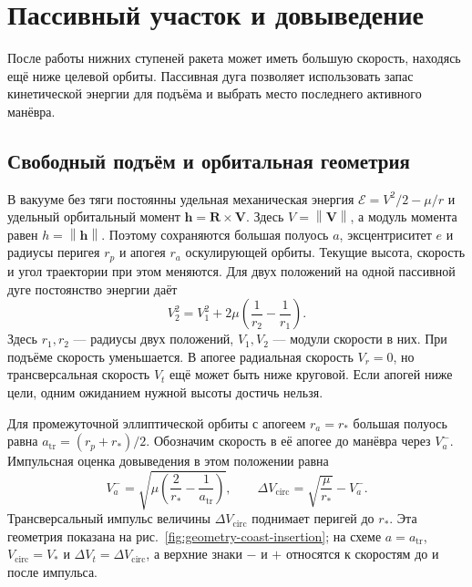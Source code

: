 \documentclass[a4paper,11pt]{article}
\newcommand{\vect}[1]{\boldsymbol{#1}}
\newcommand{\norm}[1]{\left\lVert#1\right\rVert}
\numberwithin{equation}{section}
\begin{document}
\FloatBarrier
\section{Пассивный участок и довыведение}
\label{sec:coast}

После работы нижних ступеней ракета может иметь
большую скорость, находясь ещё ниже целевой орбиты.
Пассивная дуга позволяет использовать запас кинетической
энергии для подъёма и выбрать место последнего активного манёвра.

\subsection{Свободный подъём и орбитальная геометрия}

В вакууме без тяги постоянны удельная механическая энергия
$\mathcal E=V^2/2-\mu/r$ и удельный орбитальный момент
$\vect h=\vect R\times\vect V$. Здесь $V=\norm{\vect V}$,
а модуль момента равен $h=\norm{\vect h}$.
Поэтому сохраняются большая полуось $a$, эксцентриситет $e$
и радиусы перигея $r_p$ и апогея $r_a$ оскулирующей орбиты.
Текущие высота, скорость и угол траектории при этом меняются.
Для двух положений на одной пассивной дуге постоянство энергии даёт
\begin{equation}
V_2^2=V_1^2+2\mu\left(\frac1{r_2}-\frac1{r_1}\right).
\label{eq:coast-speed}
\end{equation}
Здесь $r_1,r_2$ --- радиусы двух положений, $V_1,V_2$ ---
модули скорости в них. При подъёме скорость уменьшается.
В апогее радиальная скорость $V_r=0$, но трансверсальная
скорость $V_t$ ещё может быть ниже круговой.
Если апогей ниже цели, одним ожиданием нужной высоты
достичь нельзя.

Для промежуточной эллиптической орбиты с апогеем $r_a=r_*$
большая полуось равна $a_{\mathrm{tr}}=(r_p+r_*)/2$.
Обозначим скорость в её апогее до манёвра через $V_a^-$.
Импульсная оценка довыведения в этом положении равна
\begin{equation}
V_a^-=\sqrt{\mu\left(\frac2{r_*}
-\frac1{a_{\mathrm{tr}}}\right)},\qquad
\Delta V_{\mathrm{circ}}=\sqrt{\frac{\mu}{r_*}}-V_a^-.
\label{eq:coast-circularize}
\end{equation}
Трансверсальный импульс величины $\Delta V_{\mathrm{circ}}$
поднимает перигей до $r_*$. Эта геометрия показана
на рис.~\ref{fig:geometry-coast-insertion}; на схеме
$a=a_{\mathrm{tr}}$, $V_{\mathrm{circ}}=V_*$ и
$\Delta V_t=\Delta V_{\mathrm{circ}}$, а верхние знаки $-$ и $+$
относятся к скоростям до и после импульса.
\end{document}
